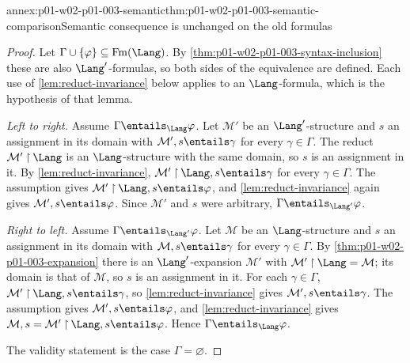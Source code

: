 \begin{annexitem}{annex:p01-w02-p01-003-semantic}{thm:p01-w02-p01-003-semantic-comparison}{Semantic consequence is unchanged on the old formulas}
\begin{proof}
Let \(\Gamma\cup\{\varphi\}\subseteq\operatorname{Fm}(\Lang)\). By
\cref{thm:p01-w02-p01-003-syntax-inclusion} these are also
\(\Lang'\)-formulas, so both sides of the equivalence are defined. Each use
of \cref{lem:reduct-invariance} below applies to an \(\Lang\)-formula,
which is the hypothesis of that lemma.

\emph{Left to right.} Assume \(\Gamma\entails_{\Lang}\varphi\). Let
\(\mathcal M'\) be an \(\Lang'\)-structure and \(s\) an assignment in its
domain with \(\mathcal M',s\entails\gamma\) for every \(\gamma\in\Gamma\).
The reduct \(\mathcal M'\mathbin{\upharpoonright}\Lang\) is an
\(\Lang\)-structure with the same domain, so \(s\) is an assignment in it.
By \cref{lem:reduct-invariance},
\(\mathcal M'\mathbin{\upharpoonright}\Lang,s\entails\gamma\) for every
\(\gamma\in\Gamma\). The assumption gives
\(\mathcal M'\mathbin{\upharpoonright}\Lang,s\entails\varphi\), and
\cref{lem:reduct-invariance} again gives \(\mathcal M',s\entails\varphi\).
Since \(\mathcal M'\) and \(s\) were arbitrary,
\(\Gamma\entails_{\Lang'}\varphi\).

\emph{Right to left.} Assume \(\Gamma\entails_{\Lang'}\varphi\). Let
\(\mathcal M\) be an \(\Lang\)-structure and \(s\) an assignment in its
domain with \(\mathcal M,s\entails\gamma\) for every \(\gamma\in\Gamma\).
By \cref{thm:p01-w02-p01-003-expansion} there is an \(\Lang'\)-expansion
\(\mathcal M'\) with \(\mathcal M'\mathbin{\upharpoonright}\Lang=\mathcal M\);
its domain is that of \(\mathcal M\), so \(s\) is an assignment in it. For
each \(\gamma\in\Gamma\), \(\mathcal M'\mathbin{\upharpoonright}\Lang,s\entails\gamma\),
so \cref{lem:reduct-invariance} gives \(\mathcal M',s\entails\gamma\). The
assumption gives \(\mathcal M',s\entails\varphi\), and
\cref{lem:reduct-invariance} gives
\(\mathcal M,s=\mathcal M'\mathbin{\upharpoonright}\Lang,s\entails\varphi\).
Hence \(\Gamma\entails_{\Lang}\varphi\).

The validity statement is the case \(\Gamma=\varnothing\).
\end{proof}
\end{annexitem}

